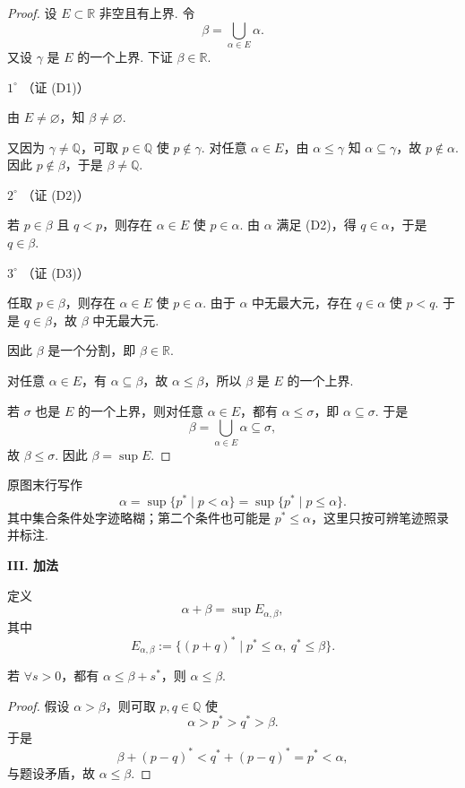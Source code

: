 \begin{proof}
设 $E \subset \mathbb{R}$ 非空且有上界. 令
\[
\beta=\bigcup_{\alpha \in E}\alpha.
\]
又设 $\gamma$ 是 $E$ 的一个上界. 下证 $\beta \in \mathbb{R}$. 

$1^\circ$ （证 (D1)）

由 $E \ne \varnothing$，知 $\beta \ne \varnothing$. 

又因为 $\gamma \ne \mathbb{Q}$，可取 $p \in \mathbb{Q}$ 使 $p \notin \gamma$. 对任意 $\alpha \in E$，由 $\alpha \le \gamma$ 知 $\alpha \subseteq \gamma$，故 $p \notin \alpha$. 因此 $p \notin \beta$，于是 $\beta \ne \mathbb{Q}$. 

$2^\circ$ （证 (D2)）

若 $p \in \beta$ 且 $q<p$，则存在 $\alpha \in E$ 使 $p \in \alpha$. 由 $\alpha$ 满足 (D2)，得 $q \in \alpha$，于是 $q \in \beta$. 

$3^\circ$ （证 (D3)）

任取 $p \in \beta$，则存在 $\alpha \in E$ 使 $p \in \alpha$. 由于 $\alpha$ 中无最大元，存在 $q \in \alpha$ 使 $p<q$. 于是 $q \in \beta$，故 $\beta$ 中无最大元. 

因此 $\beta$ 是一个分割，即 $\beta \in \mathbb{R}$. 

对任意 $\alpha \in E$，有 $\alpha \subseteq \beta$，故 $\alpha \le \beta$，所以 $\beta$ 是 $E$ 的一个上界. 

若 $\sigma$ 也是 $E$ 的一个上界，则对任意 $\alpha \in E$，都有 $\alpha \le \sigma$，即 $\alpha \subseteq \sigma$. 于是
\[
\beta=\bigcup_{\alpha \in E}\alpha \subseteq \sigma,
\]
故 $\beta \le \sigma$. 因此 $\beta=\sup E$. 
\end{proof}

\begin{notebox}
原图末行写作
\[
\alpha=\sup\{p^* \mid p<\alpha\}=\sup\{p^* \mid p\le \alpha\}.
\]
其中集合条件处字迹略糊；第二个条件也可能是 $p^* \le \alpha$，这里只按可辨笔迹照录并标注. 
\end{notebox}

\textbf{III. 加法}

定义
\[
\alpha+\beta=\sup E_{\alpha,\beta},
\]
其中
\[
E_{\alpha,\beta}:=\{(p+q)^* \mid p^* \le \alpha,\ q^* \le \beta\}.
\]

\begin{proposition}
若 $\forall s>0$，都有 $\alpha \le \beta+s^*$，则 $\alpha \le \beta$. 
\end{proposition}

\begin{proof}
假设 $\alpha>\beta$，则可取 $p,q \in \mathbb{Q}$ 使
\[
\alpha>p^*>q^*>\beta.
\]
于是
\[
\beta+(p-q)^*<q^*+(p-q)^*=p^*<\alpha,
\]
与题设矛盾，故 $\alpha \le \beta$. 
\end{proof}

